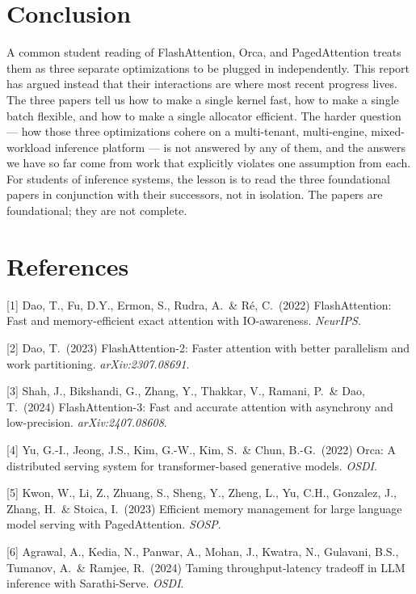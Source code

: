 \documentclass{article}
\begin{document}
\section{Conclusion}

A common student reading of FlashAttention, Orca, and PagedAttention treats them as three separate optimizations to be plugged in independently. This report has argued instead that their interactions are where most recent progress lives. The three papers tell us how to make a single kernel fast, how to make a single batch flexible, and how to make a single allocator efficient. The harder question --- how those three optimizations cohere on a multi-tenant, multi-engine, mixed-workload inference platform --- is not answered by any of them, and the answers we have so far come from work that explicitly violates one assumption from each. For students of inference systems, the lesson is to read the three foundational papers in conjunction with their successors, not in isolation. The papers are foundational; they are not complete.

\section*{References}

\small

[1] Dao, T., Fu, D.Y., Ermon, S., Rudra, A.\ \& R\'e, C.\ (2022) FlashAttention: Fast and memory-efficient exact attention with IO-awareness. \emph{NeurIPS}.

[2] Dao, T.\ (2023) FlashAttention-2: Faster attention with better parallelism and work partitioning. \emph{arXiv:2307.08691}.

[3] Shah, J., Bikshandi, G., Zhang, Y., Thakkar, V., Ramani, P.\ \& Dao, T.\ (2024) FlashAttention-3: Fast and accurate attention with asynchrony and low-precision. \emph{arXiv:2407.08608}.

[4] Yu, G.-I., Jeong, J.S., Kim, G.-W., Kim, S.\ \& Chun, B.-G.\ (2022) Orca: A distributed serving system for transformer-based generative models. \emph{OSDI}.

[5] Kwon, W., Li, Z., Zhuang, S., Sheng, Y., Zheng, L., Yu, C.H., Gonzalez, J., Zhang, H.\ \& Stoica, I.\ (2023) Efficient memory management for large language model serving with PagedAttention. \emph{SOSP}.

[6] Agrawal, A., Kedia, N., Panwar, A., Mohan, J., Kwatra, N., Gulavani, B.S., Tumanov, A.\ \& Ramjee, R.\ (2024) Taming throughput-latency tradeoff in LLM inference with Sarathi-Serve. \emph{OSDI}.
\end{document}
